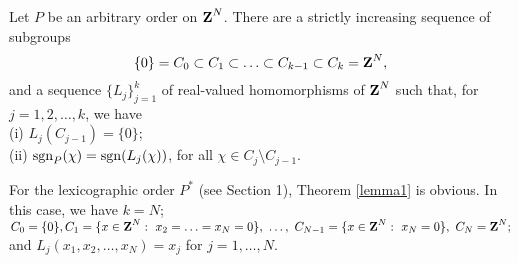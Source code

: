 \begin{lemma1}
Let $P$ be an arbitrary order on $\Z^N$.  There are a 
strictly increasing sequence of subgroups
\begin{equation}
\{0\}=C_0 \subset C_1\subset 
\ldots \subset C_{k-1}\subset C_k=\Z^N,
\label{finite-chain}
\end{equation}
and a sequence 
$\{L_j\}_{j=1}^k$ 
of real-valued homomorphisms of $\Z^N$
such that, for $j=1,2,\ldots,k$, we have \\
(i)  $ L_j\left(C_{j-1}\right)=\{0\}$;\\
(ii)  ${\rm sgn}_P(\chi)={\rm sgn} (L_j(\chi))$,
for all $\chi \in C_j\setminus C_{j-1}$.  
\label{lemma1}
\end{lemma1}
For the lexicographic order $P^*$
(see Section 1), Theorem \ref{lemma1} is obvious.  
In this case, 
we have $k=N$; $C_0=\{0\}, 
C_1=\{x\in \Z^N:\ x_2=\ldots=x_N=0\},\
\ldots,\  
C_{N-1}=\{x\in \Z^N:\ x_N=0\},\ 
C_N= \Z^N;$ and 
$L_j(x_1,x_2,\ldots,x_N)=x_j$ for $j=1,\ldots,N$.\\

